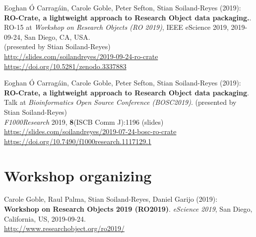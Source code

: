 Eoghan Ó Carragáin, Carole Goble, Peter Sefton, Stian Soiland-Reyes
(2019):\\
\textbf{RO-Crate, a lightweight approach to Research Object data packaging.}.\\
RO-15 at \emph{Workshop on Research Objects
(RO 2019)}, IEEE eScience 2019, 2019-09-24, San Diego, CA, USA.\\
(presented by Stian Soiland-Reyes)\\
\url{http://slides.com/soilandreyes/2019-09-24-ro-crate}\\
\url{https://doi.org/10.5281/zenodo.3337883}

Eoghan Ó Carragáin, Carole Goble, Peter Sefton, Stian Soiland-Reyes
(2019):\\
\textbf{RO-Crate, a lightweight approach to Research Object data packaging}.\\
Talk at \emph{Bioinformatics Open Source Conference (BOSC2019)}.
(presented by Stian Soiland-Reyes)\\
\emph{F1000Research} 2019, \textbf{8}(ISCB Comm J):1196 (slides)\\
\url{https://slides.com/soilandreyes/2019-07-24-bosc-ro-crate}\\
\url{https://doi.org/10.7490/f1000research.1117129.1}


\section{Workshop organizing}



Carole Goble, Raul Palma, Stian Soiland-Reyes, Daniel Garijo (2019):\\
\textbf{Workshop on Research Objects 2019 (RO2019)}.
\emph{eScience 2019}, San Diego, California, US, 2019-09-24.\\
\url{http://www.researchobject.org/ro2019/}



